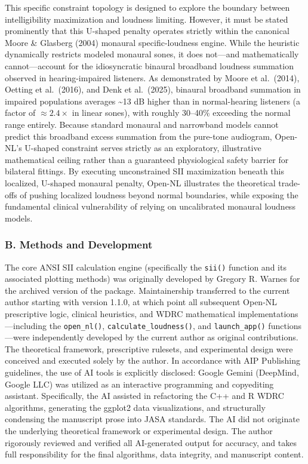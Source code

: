 \documentclass[
  12pt,
]{article}
\begin{document}
This specific constraint topology is designed to explore the boundary
between intelligibility maximization and loudness limiting. However, it
must be stated prominently that this U-shaped penalty operates strictly
within the canonical Moore \& Glasberg (2004) monaural specific-loudness
engine. While the heuristic dynamically restricts modeled monaural
sones, it does not---and mathematically cannot---account for the
idiosyncratic binaural broadband loudness summation observed in
hearing-impaired listeners. As demonstrated by Moore et al.~(2014),
Oetting et al.~(2016), and Denk et al.~(2025), binaural broadband
summation in impaired populations averages \textasciitilde13 dB higher
than in normal-hearing listeners (a factor of \(\approx 2.4\times\) in
linear sones), with roughly 30--40\% exceeding the normal range
entirely. Because standard monaural and narrowband models cannot predict
this broadband excess summation from the pure-tone audiogram, Open-NL's
U-shaped constraint serves strictly as an exploratory, illustrative
mathematical ceiling rather than a guaranteed physiological safety
barrier for bilateral fittings. By executing unconstrained SII
maximization beneath this localized, U-shaped monaural penalty, Open-NL
illustrates the theoretical trade-offs of pushing localized loudness
beyond normal boundaries, while exposing the fundamental clinical
vulnerability of relying on uncalibrated monaural loudness models.

\subsubsection{B. Methods and
Development}\label{b.-methods-and-development}

The core ANSI SII calculation engine (specifically the \texttt{sii()}
function and its associated plotting methods) was originally developed
by Gregory R. Warnes for the archived version of the package.
Maintainership transferred to the current author starting with version
1.1.0, at which point all subsequent Open-NL prescriptive logic,
clinical heuristics, and WDRC mathematical implementations---including
the \texttt{open\_nl()}, \texttt{calculate\_loudness()}, and
\texttt{launch\_app()} functions---were independently developed by the
current author as original contributions. The theoretical framework,
prescriptive rulesets, and experimental design were conceived and
executed solely by the author. In accordance with AIP Publishing
guidelines, the use of AI tools is explicitly disclosed: Google Gemini
(DeepMind, Google LLC) was utilized as an interactive programming and
copyediting assistant. Specifically, the AI assisted in refactoring the
C++ and R WDRC algorithms, generating the ggplot2 data visualizations,
and structurally condensing the manuscript prose into JASA standards.
The AI did not originate the underlying theoretical framework or
experimental design. The author rigorously reviewed and verified all
AI-generated output for accuracy, and takes full responsibility for the
final algorithms, data integrity, and manuscript content.
\end{document}
